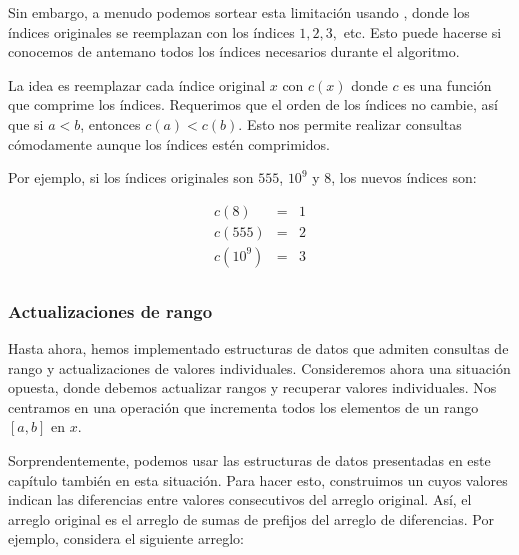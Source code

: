 
Sin embargo, a menudo podemos sortear esta limitación
usando ,
donde los índices originales se reemplazan
con los índices $1,2,3,$ etc.
Esto puede hacerse si conocemos de antemano todos los índices
necesarios durante el algoritmo.

La idea es reemplazar cada índice original $x$
con $c(x)$ donde $c$ es una función que
comprime los índices.
Requerimos que el orden de los índices
no cambie, así que si $a<b$, entonces $c(a)<c(b)$.
Esto nos permite realizar consultas cómodamente
aunque los índices estén comprimidos.

Por ejemplo, si los índices originales son
$555$, $10^9$ y $8$, los nuevos índices son:

\[
\begin{array}{lcl}
c(8) & = & 1 \\
c(555) & = & 2 \\
c(10^9) & = & 3 \\
\end{array}
\]

\subsubsection{Actualizaciones de rango}

Hasta ahora, hemos implementado estructuras de datos
que admiten consultas de rango y actualizaciones
de valores individuales.
Consideremos ahora una situación opuesta,
donde debemos actualizar rangos y
recuperar valores individuales.
Nos centramos en una operación que incrementa todos
los elementos de un rango $[a,b]$ en $x$.


Sorprendentemente, podemos usar las estructuras de datos
presentadas en este capítulo también en esta situación.
Para hacer esto, construimos un 
cuyos valores indican
las diferencias entre valores consecutivos
del arreglo original.
Así, el arreglo original es el
arreglo de sumas de prefijos del
arreglo de diferencias.
Por ejemplo, considera el siguiente arreglo:

\begin{center}
\end{center}

